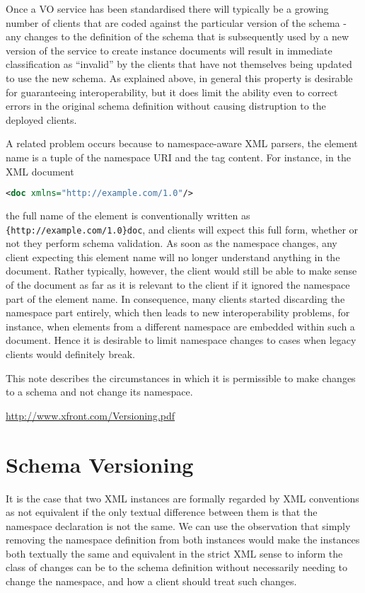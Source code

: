 \documentclass[10pt,a4paper]{ivoa}
\begin{document}
Once a VO service has been standardised there will typically be a growing number
of clients that are coded against the particular version of the
schema - any changes to the definition of the schema that is subsequently used
by a new version of the service to create instance documents will result in
immediate classification as ``invalid'' by the clients that have not themselves being
updated to use the new schema.
As explained above, in general this property is desirable for guaranteeing interoperability, but it does limit
the ability even to correct errors in the original schema definition without
causing distruption to the deployed clients. 

A related problem occurs because to namespace-aware XML parsers, the
element name is a tuple of the namespace URI and the tag content.  For
instance, in the XML document

\begin{lstlisting}[language=XML]
<doc xmlns="http://example.com/1.0"/>
\end{lstlisting}

the full name of the element is conventionally written as
\verb|{http://example.com/1.0}doc|, and clients will expect this full
form, whether or not they perform schema validation.  As soon as the
namespace changes, any client expecting this element name will no longer
understand anything in the document.  Rather typically, however, the
client would still be able to make sense of the document as far as it is
relevant to the client if it ignored the namespace part of the element
name.  In consequence, many clients started discarding the namespace
part entirely, which then leads to new interoperability problems, for
instance, when elements from a different namespace are embedded within
such a document.  Hence it is desirable to limit namespace changes to
cases when legacy clients would definitely break.

This note describes the
circumstances in which it is permissible to make changes to a schema and not
change its namespace.

\url{http://www.xfront.com/Versioning.pdf}


\section{Schema Versioning}
It is the case that two XML instances are formally regarded by XML
conventions as not equivalent if the only textual difference between them is
that the namespace declaration is not the same. We
can use the observation that simply removing the namespace definition from both instances
would make the instances both textually the same and equivalent in the strict
XML sense to inform the class of changes can be to the schema definition without
necessarily needing to change the namespace, and how a client should treat such
changes.
\end{document}
